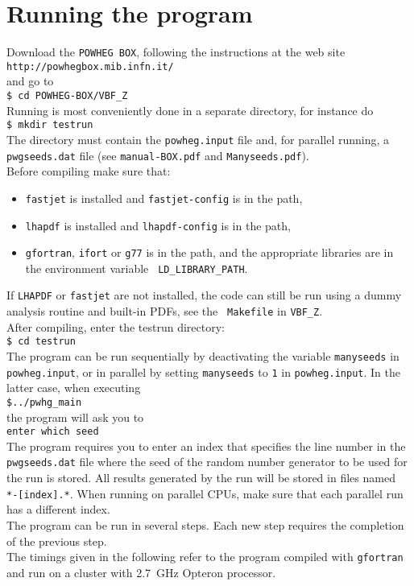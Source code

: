 \documentclass[a4paper,11pt]{article}
\begin{document}
\section*{Running the program}
%
Download the {\tt POWHEG BOX}, following the instructions at the web site 
\\[2ex]
{\tt http://powhegbox.mib.infn.it/}
\\[2ex] 
and go to 
\\[2ex]
{\tt \$ cd POWHEG-BOX/VBF\_Z}
\\[2ex]
Running is most conveniently done in a separate directory, for instance do
\\[2ex]
{\tt \$ mkdir testrun}
\\[2ex]
The directory must contain the {\tt powheg.input} file and, for
parallel running, a {\tt pwgseeds.dat} file (see {\tt manual-BOX.pdf}
and {\tt Manyseeds.pdf}).
\\[2ex]
Before compiling make sure that:
\begin{itemize}
\item 
{\tt fastjet} is installed and {\tt fastjet-config} is in the path,
\item 
{\tt lhapdf} is installed and {\tt lhapdf-config} is in the path,
\item
{\tt gfortran}, {\tt ifort} or {\tt g77} is in the path, and the
appropriate libraries are in the environment variable {\tt
  LD\_LIBRARY\_PATH}. 
\end{itemize}
%
If {\tt LHAPDF} or {\tt fastjet} are not installed, the code can still
be run using a dummy analysis routine and built-in PDFs, see the {\tt
  Makefile} in {\tt VBF\_Z}.
%
\\[2ex]
After compiling, enter the testrun directory:
\\[2ex]
{\tt \$ cd testrun}
\\[2ex]
The program can be run sequentially by deactivating the variable {\tt manyseeds} in {\tt powheg.input},  or in parallel by setting {\tt manyseeds} to {\tt 1} in {\tt powheg.input}. In the latter case, when executing
\\[2ex]
{\tt \$../pwhg\_main}
\\[2ex]
the program will ask you to
\\[2ex]
{\tt enter which seed}
\\[2ex]
The program requires you to enter an index that specifies the line
number in the {\tt pwgseeds.dat} file where the seed of the random
number generator to be used for the run is stored. All results
generated by the run will be stored in files named {\tt
  *-[index].*}. When running on parallel CPUs, make sure that each
parallel run has a different index.
\\[2ex]
The program can be run in several steps. Each new step requires the
completion of the previous step.
\\[2ex]
The timings given in the following refer to the program compiled with
{\tt gfortran} and run on a cluster with 2.7~GHz Opteron processor.
% 
\end{document}
